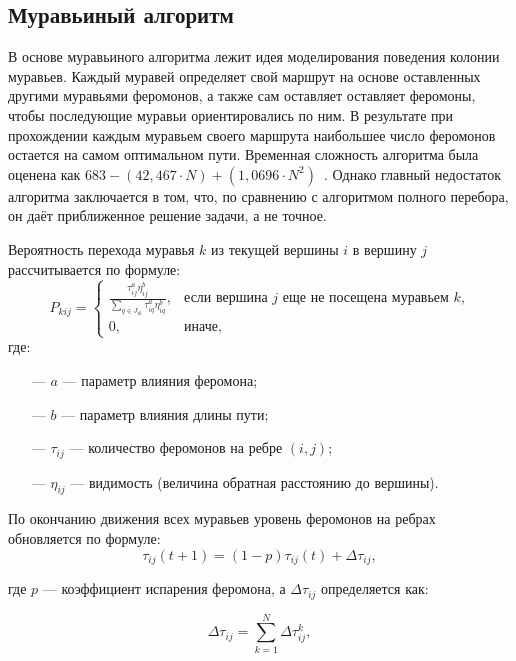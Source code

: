 \subsection{Муравьиный алгоритм}
В основе муравьиного алгоритма лежит идея моделирования поведения колонии муравьев. Каждый муравей определяет свой маршрут на основе оставленных другими муравьями феромонов, а также сам оставляет оставляет феромоны, чтобы последующие муравьи ориентировались по ним. В результате при прохождении каждым муравьем своего маршрута наибольшее число феромонов остается на самом оптимальном пути. Временная сложность алгоритма была оценена как $683 - (42,467 · N) + (1,0696 · N^2)$~\cite{ants}. Однако главный недостаток алгоритма заключается в том, что, по сравнению с алгоритмом полного перебора, он даёт приближенное решение задачи, а не точное.

Вероятность перехода муравья $k$ из текущей вершины $i$ в вершину $j$ рассчитывается по формуле:
\begin{equation}
    \label{posib}
    P_{kij} = 
    \begin{cases}
        \frac{\tau_{ij}^a \eta_{ij}^b}{\sum_{q \in J_{ik}} \tau_{iq}^a \eta_{iq}^b}, & \text{если вершина $j$ еще не посещена муравьем $k$,} \\
        0, & \text{иначе,}
    \end{cases}
\end{equation}
где:
\begin{itemize}
    \item[---] $a$ --- параметр влияния феромона;
    \item[---] $b$ --- параметр влияния длины пути;
    \item[---] $\tau_{ij}$ --- количество феромонов на ребре $(i, j)$;
    \item[---] $\eta_{ij}$ --- видимость (величина обратная расстоянию до вершины).
\end{itemize}

По окончанию движения всех муравьев уровень феромонов на ребрах обновляется по формуле:
\begin{equation}
    \label{update_phero_1}
    \tau_{ij}(t+1) = (1-p)\tau_{ij}(t) + \Delta \tau_{ij},
\end{equation}

где $p$ — коэффициент испарения феромона, а $\Delta \tau_{ij}$ определяется как:

\begin{equation}
    \label{update_phero_2}
    \Delta \tau_{ij} = \sum_{k=1}^N \Delta \tau_{ij}^k,
\end{equation}

